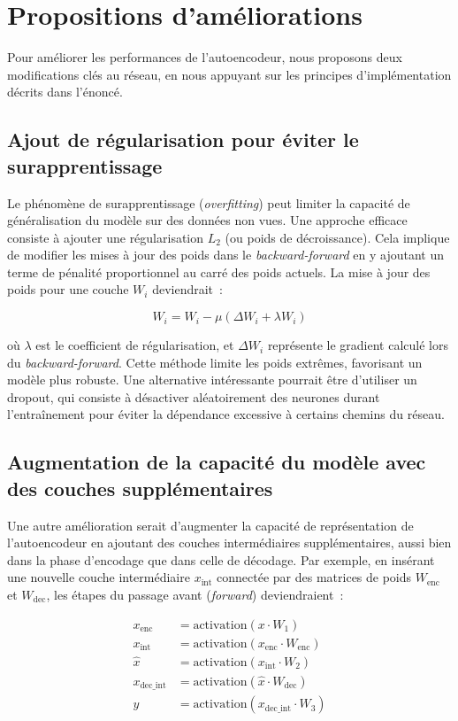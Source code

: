 \documentclass{article}
\begin{document}
\section{Propositions d'améliorations}

\noindent Pour améliorer les performances de l'autoencodeur, nous proposons deux modifications clés au réseau, en nous appuyant sur les principes d'implémentation décrits dans l'énoncé.

\subsection{Ajout de régularisation pour éviter le surapprentissage}

\noindent Le phénomène de surapprentissage (\textit{overfitting}) peut limiter la capacité de généralisation du modèle sur des données non vues. Une approche efficace consiste à ajouter une régularisation $L_2$ (ou poids de décroissance). Cela implique de modifier les mises à jour des poids dans le \textit{backward-forward} en y ajoutant un terme de pénalité proportionnel au carré des poids actuels. La mise à jour des poids pour une couche $W_i$ deviendrait :

\[
W_i = W_i - \mu
\left(
\Delta W_i + \lambda W_i
\right)
\]

\noindent où $\lambda$ est le coefficient de régularisation, et $\Delta W_i$ représente le gradient calculé lors du \textit{backward-forward}. Cette méthode limite les poids extrêmes, favorisant un modèle plus robuste. Une alternative intéressante pourrait être d'utiliser un dropout, qui consiste à désactiver aléatoirement des neurones durant l'entraînement pour éviter la dépendance excessive à certains chemins du réseau.

\subsection{Augmentation de la capacité du modèle avec des couches supplémentaires}

\noindent Une autre amélioration serait d'augmenter la capacité de représentation de l'autoencodeur en ajoutant des couches intermédiaires supplémentaires, aussi bien dans la phase d'encodage que dans celle de décodage. Par exemple, en insérant une nouvelle couche intermédiaire $x_{\text{int}}$ connectée par des matrices de poids $W_{\text{enc}}$ et $W_{\text{dec}}$, les étapes du passage avant (\textit{forward}) deviendraient :

\begin{align*}
x_{\text{enc}} &= \text{activation}(x \cdot W_1) \\
x_{\text{int}} &= \text{activation}(x_{\text{enc}} \cdot W_{\text{enc}}) \\
\hat{x} &= \text{activation}(x_{\text{int}} \cdot W_2) \\
x_{\text{dec\_int}} &= \text{activation}(\hat{x} \cdot W_{\text{dec}}) \\
y &= \text{activation}(x_{\text{dec\_int}} \cdot W_3)
\end{align*}
\end{document}
